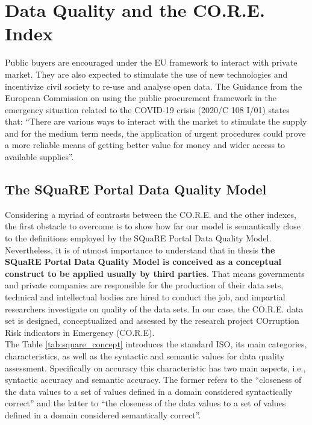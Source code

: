 \documentclass[a4paper, twoside]{report}
\begin{document}
\clearpage

\chapter{Data Quality and the CO.R.E. Index}
\label{data_quality_chapter}

Public buyers are encouraged under the EU framework to interact with private market. They are also expected to stimulate the use of new technologies and incentivize civil society to re-use and analyse open data. The Guidance from the European Commission on using the public procurement framework in the emergency situation related to the COVID-19 crisis (2020/C 108 I/01) states that: “There are various ways to interact with the market to stimulate the supply and for the medium term needs, the application of urgent procedures could prove a more reliable means of getting better value for money and wider access to available supplies”. \\


\section{The SQuaRE Portal Data Quality Model}

Considering a myriad of contrasts between the CO.R.E. and the other indexes, the first obstacle to overcome is to show how far our model is semantically close to the definitions employed by the SQuaRE Portal Data Quality Model. Nevertheless, it is of utmost importance to understand that in thesis \textbf{the SQuaRE Portal Data Quality Model is conceived as a conceptual construct to be applied usually by third parties}. That means governments and private companies are responsible for the production of their data sets, technical and intellectual bodies are hired to conduct the job, and impartial researchers investigate on quality of the data sets. In our case, the CO.R.E. data set is designed, conceptualized and assessed by the research project COrruption Risk indicators in Emergency (CO.R.E).\\ 

The Table \ref{tab:square_concept} introduces the standard ISO, its main categories, characteristics, as well as the syntactic and semantic values for data quality assessment. Specifically on accuracy this characteristic has two main aspects, i.e., syntactic accuracy and semantic accuracy. The former refers to the ``closeness of the data values to a set of values defined in a domain considered syntactically correct'' and the latter to ``the closeness of the data values to a set of values defined in a domain considered semantically correct''.\\
\end{document}
